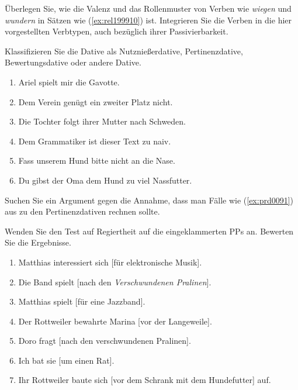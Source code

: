 \Uebung[\tristar] \label{u133} Überlegen Sie, wie die Valenz und das Rollenmuster von Verben wie \textit{wiegen} und \textit{wundern} in Sätzen wie (\ref{ex:rel199910}) ist.
Integrieren Sie die Verben in die hier vorgestellten Verbtypen, auch bezüglich ihrer Passivierbarkeit.

\begin{exe}
  \ex\label{ex:rel199910}
  \begin{xlist}
  \end{xlist}
\end{exe}

\Uebung \label{u134} Klassifizieren Sie die Dative als Nutznießerdative, Pertinenzdative, Bewertungsdative oder andere Dative.

\begin{enumerate}\Lf
  \item Ariel spielt mir die Gavotte.
  \item Dem Verein genügt ein zweiter Platz nicht.
  \item Die Tochter folgt ihrer Mutter nach Schweden.
  \item Dem Grammatiker ist dieser Text zu naiv.
  \item Fass unserem Hund bitte nicht an die Nase.
  \item Du gibst der Oma dem Hund zu viel Nassfutter.
\end{enumerate}

\Uebung[\tristar] \label{u135} Suchen Sie ein Argument gegen die Annahme, dass man Fälle wie (\ref{ex:prd0091}) aus \citet[299]{Eisenberg2} zu den Pertinenzdativen rechnen sollte.

\begin{exe}
\end{exe}

\Uebung \label{u136} Wenden Sie den Test auf Regiertheit auf die eingeklammerten PPs an.
Bewerten Sie die Ergebnisse.

\begin{enumerate}\Lf
  \item Matthias interessiert sich [für elektronische Musik].
  \item Die Band spielt [nach den \textit{Verschwundenen Pralinen}].
  \item Matthias spielt [für eine Jazzband].
  \item Der Rottweiler bewahrte Marina [vor der Langeweile].
  \item Doro fragt [nach den verschwundenen Pralinen].
  \item Ich bat sie [um einen Rat].
  \item Ihr Rottweiler baute sich [vor dem Schrank mit dem Hundefutter] auf.
\end{enumerate}

